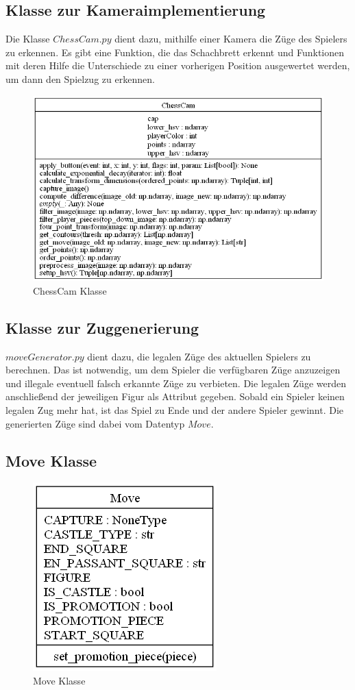 \subsection{Klasse zur Kameraimplementierung}
Die Klasse \(ChessCam.py\) dient dazu, mithilfe einer Kamera die Züge des Spielers zu erkennen. Es gibt eine Funktion, die das Schachbrett erkennt und 
Funktionen mit deren Hilfe die Unterschiede zu einer vorherigen Position ausgewertet werden, um dann den Spielzug zu erkennen.
\begin{figure}[ht]
    \centering
    \includegraphics[scale=0.6]{images/class_cam.png}
    \caption{ChessCam Klasse}
\end{figure}

\subsection{Klasse zur Zuggenerierung}
\(moveGenerator.py\) dient dazu, die legalen Züge des aktuellen Spielers zu berechnen. Das ist notwendig, um dem Spieler die verfügbaren Züge anzuzeigen und 
illegale eventuell falsch erkannte Züge zu verbieten. Die legalen Züge werden anschließend der jeweiligen Figur als Attribut gegeben.
Sobald ein Spieler keinen legalen Zug mehr hat, ist das Spiel zu Ende und der andere Spieler gewinnt. Die generierten Züge sind dabei vom Datentyp \(Move\).

\subsection{Move Klasse}
\begin{figure}[H]
    \centering
    \includegraphics[scale=0.7]{images/class_move.png}
    \caption{Move Klasse}
\end{figure}

